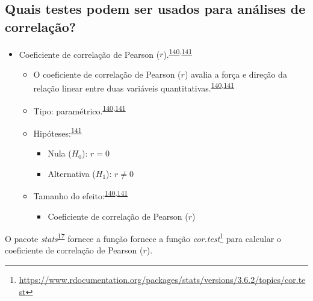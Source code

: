 \documentclass[
]{book}
\providecommand{\tightlist}{%
  \setlength{\itemsep}{0pt}\setlength{\parskip}{0pt}}
\renewcommand{\href}[2]{#2\footnote{\url{#1}}}
\newenvironment{infobox}[1]
  {
  \begin{itemize}
  \renewcommand{\labelitemi}{
    \raisebox{-.7\height}[0pt][0pt]{
      {\setkeys{Gin}{width=3em,keepaspectratio}
        \texttt{[image: \#1]}}
    }
  }
  \setlength{\fboxsep}{1em}
  \begin{blackbox}
  \item
  }
  {
  \end{blackbox}
  \end{itemize}
  }
\begin{document}
\hypertarget{quais-testes-podem-ser-usados-para-anuxe1lises-de-correlauxe7uxe3o}{%
\subsection{Quais testes podem ser usados para análises de correlação?}\label{quais-testes-podem-ser-usados-para-anuxe1lises-de-correlauxe7uxe3o}}

\begin{itemize}
\item
  Coeficiente de correlação de Pearson (\(r\)).\textsuperscript{\protect\hyperlink{ref-khamis2008}{140},\protect\hyperlink{ref-allison2022}{141}}

  \begin{itemize}
  \item
    O coeficiente de correlação de Pearson (\(r\)) avalia a força e direção da relação linear entre duas variáveis quantitativas.\textsuperscript{\protect\hyperlink{ref-khamis2008}{140},\protect\hyperlink{ref-allison2022}{141}}
  \item
    Tipo: paramétrico.\textsuperscript{\protect\hyperlink{ref-khamis2008}{140},\protect\hyperlink{ref-allison2022}{141}}
  \item
    Hipóteses:\textsuperscript{\protect\hyperlink{ref-allison2022}{141}}

    \begin{itemize}
    \item
      Nula (\(H_{0}\)): \(r=0\)
    \item
      Alternativa (\(H_{1}\)): \(r≠0\)
    \end{itemize}
  \item
    Tamanho do efeito:\textsuperscript{\protect\hyperlink{ref-khamis2008}{140},\protect\hyperlink{ref-allison2022}{141}}

    \begin{itemize}
    \tightlist
    \item
      Coeficiente de correlação de Pearson (\(r\))
    \end{itemize}
  \end{itemize}
\end{itemize}

\begin{infobox}{images/Rlogo}
O pacote \emph{stats}\textsuperscript{\protect\hyperlink{ref-stats-2}{17}} fornece a função fornece a função \href{https://www.rdocumentation.org/packages/stats/versions/3.6.2/topics/cor.test}{\emph{cor.test}} para calcular o coeficiente de correlação de Pearson (\(r\)).

\end{infobox}
\end{document}
